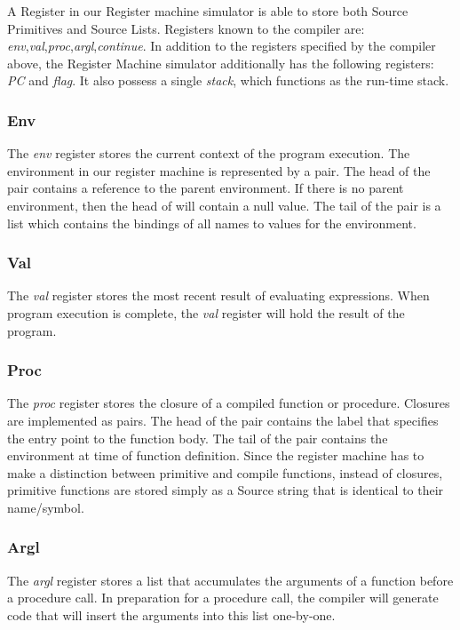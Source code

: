 \noindent
A Register in our Register machine simulator is able to store both Source Primitives and Source Lists. Registers known to the compiler are: \textit{env},\textit{val},\textit{proc},\textit{argl},\textit{continue}. In addition to the registers specified by the compiler above, the Register Machine simulator additionally has the following registers: \textit{PC} and \textit{flag}. It also possess a single \textit{stack}, which functions as the run-time stack.


\subsubsection{Env}
The \textit{env} register stores the current context of the program execution. The environment in our register machine is represented by a pair. The head of the pair contains a reference to the parent environment. If there is no parent environment, then the head of will contain a null value. The tail of the pair is a list which contains the bindings of all names to values for the environment. 

\subsubsection{Val}
The \textit{val} register stores the most recent result of evaluating expressions. When program execution is complete, the \textit{val} register will hold the result of the program.

\subsubsection{Proc}
The \textit{proc} register stores the closure of a compiled function or procedure. Closures are implemented as pairs. The head of the pair contains the label that specifies the entry point to the function body. The tail of the pair contains the environment at time of function definition. Since the register machine has to make a distinction between primitive and compile functions, instead of closures, primitive functions are stored simply as a Source string that is identical to their name/symbol.

\subsubsection{Argl}
The \textit{argl} register stores a list that accumulates the arguments of a function before a procedure call. In preparation for a procedure call, the compiler will generate code that will insert the arguments into this list one-by-one.

